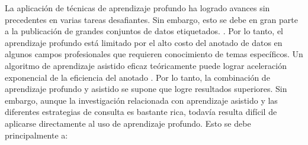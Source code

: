 La aplicación de técnicas de aprendizaje profundo ha logrado avances sin precedentes en varias
tareas desafiantes. Sin embargo, esto se debe en gran parte a la publicación de grandes conjuntos de datos etiquetados. \cite{bengio2006greedy,krizhevsky2012imagenet}. Por lo tanto, el aprendizaje profundo está limitado por el alto costo del anotado de datos en algunos campos profesionales
que requieren conocimiento de temas específicos. Un algoritmo de aprendizaje asistido eficaz teóricamente puede lograr aceleración exponencial de la eficiencia del anotado \cite{balcan2009agnostic}. Por lo tanto, la combinación de aprendizaje profundo y asistido se supone que logre resultados superiores. Sin embargo, aunque la investigación relacionada con aprendizaje asistido y las diferentes estrategias de consulta es bastante rica, todavía resulta difícil de aplicarse directamente al uso de aprendizaje profundo. Esto se debe principalmente a: 




